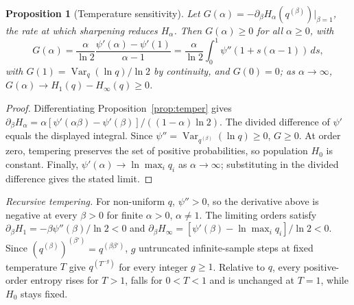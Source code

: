 \documentclass[10pt]{article}
\theoremstyle{plain}
\newtheorem{proposition}{Proposition}
\theoremstyle{definition}
\newcommand{\Var}{\operatorname{Var}}
\begin{document}
\begin{proposition}[Temperature sensitivity]
\label{prop:sens}
Let $G(\alpha)=-\partial_\beta H_\alpha(q^{(\beta)})\big|_{\beta=1}$, the rate at which sharpening reduces $H_\alpha$. Then $G(\alpha)\ge0$ for all $\alpha\ge0$, with
\[
G(\alpha)=\frac{\alpha}{\ln2}\frac{\psi'(\alpha)-\psi'(1)}{\alpha-1}
=\frac{\alpha}{\ln2}\int_0^1\psi''(1+s(\alpha-1))\,ds,
\]
with $G(1)=\operatorname{Var}_q(\ln q)/\ln2$ by continuity, and $G(0)=0$; as $\alpha\to\infty$, $G(\alpha)\to H_1(q)-H_\infty(q)\ge0$.
\end{proposition}
\begin{proof}
Differentiating Proposition~\ref{prop:temper} gives
$\partial_\beta H_\alpha=\alpha[\psi'(\alpha\beta)-\psi'(\beta)]/((1-\alpha)\ln2)$.
The divided difference of $\psi'$ equals the displayed integral. Since
$\psi''=\Var_{q^{(\beta)}}(\ln q)\ge0$, $G\ge0$. At order zero, tempering preserves the set of
positive probabilities, so population $H_0$ is constant. Finally, $\psi'(\alpha)\to\ln\max_i q_i$ as
$\alpha\to\infty$; substituting in the divided difference gives the stated limit.
\end{proof}

\emph{Recursive tempering.} For non-uniform $q$, $\psi''>0$, so the derivative above is negative at every $\beta>0$ for finite $\alpha>0$, $\alpha\ne1$. The limiting orders satisfy $\partial_\beta H_1=-\beta\psi''(\beta)/\ln2<0$ and $\partial_\beta H_\infty=[\psi'(\beta)-\ln\max_i q_i]/\ln2<0$. Since $(q^{(\beta)})^{(\beta')}=q^{(\beta\beta')}$, $g$ untruncated infinite-sample steps at fixed temperature $T$ give $q^{(T^{-g})}$ for every integer $g\ge1$. Relative to $q$, every positive-order entropy rises for $T>1$, falls for $0<T<1$ and is unchanged at $T=1$, while $H_0$ stays fixed.
\end{document}
